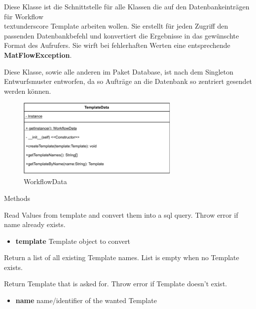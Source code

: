 
Diese Klasse ist die Schnittstelle für alle Klassen die auf den Datenbankeinträgen für Workflow\\textunderscore Template arbeiten wollen. Sie erstellt für jeden Zugriff den passenden Datenbankbefehl und konvertiert die Ergebnisse in das gewünschte Format des Aufrufers.
Sie wirft bei fehlerhaften Werten eine entsprechende \textbf{MatFlowException}.

Diese Klasse, sowie alle anderen im Paket Database, ist nach dem Singleton Entwurfsmuster entworfen, da so Aufträge an die Datenbank so zentriert gesendet werden können.
\begin{figure}[h]
	\centering
	\includegraphics[width=0.7\textwidth]{res/Klassen/TemplateData.pdf} 
	\caption{WorkflowData}
	\label{fig:workflowDataClass}
\end{figure}

\begin{methodenv}{Methods}
	
Read Values from template and convert them into a sql query.
Throw error if name already exists.

\begin{itemize}
	\item \textbf{template}
	Template object to convert
\end{itemize}

Return a list of all existing Template names.
List is empty when no Template exists.

Return Template that is asked for.
Throw error if Template doesn't exist.

\begin{itemize}
	\item \textbf{name}
	name/identifier of the wanted Template
\end{itemize}

\end{methodenv}

